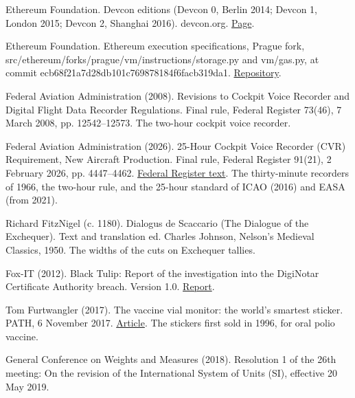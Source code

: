 \documentclass[11pt,twoside]{article}
\theoremstyle{thielethm}
\theoremstyle{thieledef}
\theoremstyle{thieledef}
\theoremstyle{thieledef}
\theoremstyle{thielethm}
\theoremstyle{thieleobs}
\theoremstyle{thielethm}
\begin{document}
\noindent Ethereum Foundation. Devcon editions (Devcon 0, Berlin 2014; Devcon 1, London 2015; Devcon 2, Shanghai 2016). devcon.org. \href{https://devcon.org/past-events}{Page}.
\par\medskip

\noindent Ethereum Foundation. Ethereum execution specifications, Prague fork, src/ethereum/forks/prague/vm/instructions/storage.py and vm/gas.py, at commit ecb68f21a7d28db101c769878184f6facb319da1. \href{https://github.com/ethereum/execution-specs}{Repository}.
\par\medskip

\noindent Federal Aviation Administration (2008). Revisions to Cockpit Voice Recorder and Digital Flight Data Recorder Regulations. Final rule, Federal Register 73(46), 7 March 2008, pp. 12542--12573. The two-hour cockpit voice recorder.
\par\medskip

\noindent Federal Aviation Administration (2026). 25-Hour Cockpit Voice Recorder (CVR) Requirement, New Aircraft Production. Final rule, Federal Register 91(21), 2 February 2026, pp. 4447--4462. \href{https://www.govinfo.gov/content/pkg/FR-2026-02-02/html/2026-02110.htm}{Federal Register text}. The thirty-minute recorders of 1966, the two-hour rule, and the 25-hour standard of ICAO (2016) and EASA (from 2021).
\par\medskip

\noindent Richard FitzNigel (c. 1180). Dialogus de Scaccario (The Dialogue of the Exchequer). Text and translation ed. Charles Johnson, Nelson's Medieval Classics, 1950. The widths of the cuts on Exchequer tallies.
\par\medskip

\noindent Fox-IT (2012). Black Tulip: Report of the investigation into the DigiNotar Certificate Authority breach. Version 1.0. \href{https://roselabs.nl/files/audit_reports/Fox-IT_-_DigiNotar.pdf}{Report}.
\par\medskip

\noindent Tom Furtwangler (2017). The vaccine vial monitor: the world's smartest sticker. PATH, 6 November 2017. \href{https://www.path.org/articles/vaccine-vial-monitor-worlds-smartest-sticker/}{Article}. The stickers first sold in 1996, for oral polio vaccine.
\par\medskip

\noindent General Conference on Weights and Measures (2018). Resolution 1 of the 26th meeting: On the revision of the International System of Units (SI), effective 20 May 2019.
\par\medskip
\end{document}
